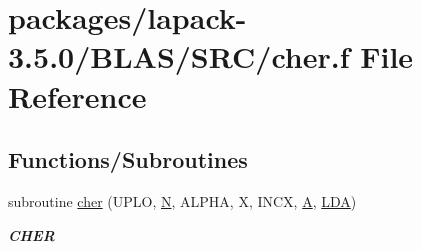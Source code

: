 \hypertarget{lapack-3_85_80_2BLAS_2SRC_2cher_8f}{}\section{packages/lapack-\/3.5.0/\+B\+L\+A\+S/\+S\+R\+C/cher.f File Reference}
\label{lapack-3_85_80_2BLAS_2SRC_2cher_8f}
\subsection*{Functions/\+Subroutines}
\begin{DoxyCompactItemize}
\item 
subroutine \hyperlink{group__complex__blas__level2_gafa73370c613ec8f157771992010809ac}{cher} (U\+P\+L\+O, \hyperlink{polmisc_8c_a0240ac851181b84ac374872dc5434ee4}{N}, A\+L\+P\+H\+A, X, I\+N\+C\+X, \hyperlink{classA}{A}, \hyperlink{example__user_8c_ae946da542ce0db94dced19b2ecefd1aa}{L\+D\+A})
\begin{DoxyCompactList}\small\item\em {\bfseries C\+H\+E\+R} \end{DoxyCompactList}\end{DoxyCompactItemize}
